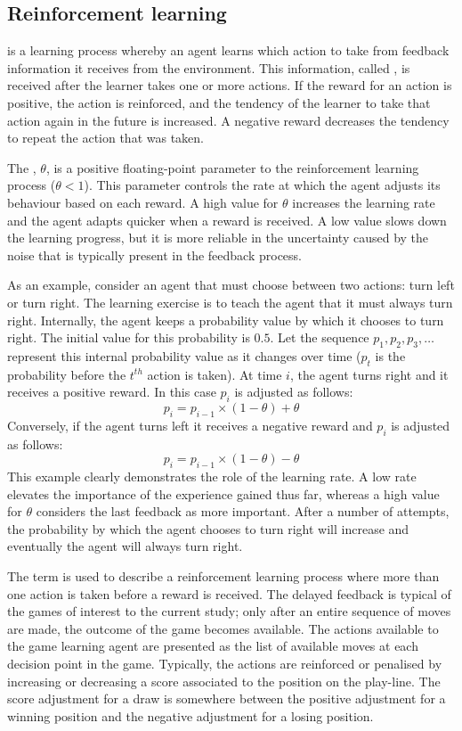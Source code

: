 \subsection{Reinforcement learning}
 \cite{sutton:learning} is a learning process whereby an agent learns which action to take from feedback information it receives from the environment.  This information, called , is received after the learner takes one or more actions. If the reward for an action is positive, the action is reinforced, and the tendency of the learner to take that action again in the future is increased. A negative reward decreases the tendency to repeat the action that was taken.  

The , $\theta$, is a positive floating-point parameter to the reinforcement learning process ($\theta < 1$).   This parameter controls the rate at which the agent adjusts its behaviour based on each reward.  A high value for  $\theta$ increases the learning rate and the agent adapts quicker when a reward is received. A low value slows down the learning progress, but it is more reliable in the uncertainty caused by the noise that is typically present in the feedback process.     

As an example, consider an agent that must choose between two actions: turn left or turn right. The learning exercise is to teach the agent that it must always turn right. Internally, the agent keeps a probability value by which it chooses to turn right.  The initial value for this probability is $0.5$. Let the sequence $p_1,p_2,  p_3,\ldots $ represent this internal probability value as it changes over time ($p_t$ is the probability before the $t^{th}$ action is taken). At time $i$, the agent turns right and it receives a positive reward. In this case $p_i$ is adjusted as follows:
\[ p_i = p_{i-1} \times (1-\theta) + \theta \]
Conversely, if the agent turns left it receives a negative reward and $p_i$ is adjusted as follows:
\[ p_i = p_{i-1} \times (1-\theta) - \theta \]
This example clearly demonstrates the role of the learning rate.  A low rate elevates the importance of the experience gained thus far, whereas a high value for $\theta$ considers the last feedback as more important. After a number of attempts, the probability by which the agent chooses to turn right will increase and eventually the agent will always turn right. 

The term  is used to describe a reinforcement learning process where more than one action is taken before a reward is received. The delayed feedback is typical of the games of interest to the current study; only after an entire sequence of moves are made, the outcome of the game becomes available. The actions available to the game learning agent are presented as the list of available moves at each decision point in the game. Typically, the actions are reinforced or penalised by increasing or decreasing a score associated to the position on the play-line. The score adjustment for a draw is somewhere between the positive adjustment for a winning position and the negative adjustment for a losing position.  

